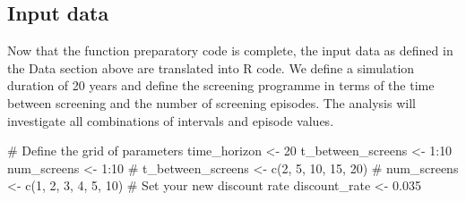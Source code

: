 \documentclass[
]{article}
\newenvironment{Shaded}{\begin{snugshade}}{\end{snugshade}}
\newcommand{\CommentTok}[1]{\textcolor[rgb]{0.37,0.37,0.37}{#1}}
\newcommand{\ControlFlowTok}[1]{\textcolor[rgb]{0.00,0.23,0.31}{\textbf{#1}}}
\newcommand{\DecValTok}[1]{\textcolor[rgb]{0.68,0.00,0.00}{#1}}
\newcommand{\FloatTok}[1]{\textcolor[rgb]{0.68,0.00,0.00}{#1}}
\newcommand{\FunctionTok}[1]{\textcolor[rgb]{0.28,0.35,0.67}{#1}}
\newcommand{\NormalTok}[1]{\textcolor[rgb]{0.00,0.23,0.31}{#1}}
\newcommand{\OtherTok}[1]{\textcolor[rgb]{0.00,0.23,0.31}{#1}}
\newcommand{\SpecialCharTok}[1]{\textcolor[rgb]{0.37,0.37,0.37}{#1}}
\begin{document}
\begin{Shaded}
\end{Shaded}

\subsection{Input data}\label{input-data}

Now that the function preparatory code is complete, the input data as
defined in the Data section above are translated into R code. We define
a simulation duration of 20 years and define the screening programme in
terms of the time between screening and the number of screening
episodes. The analysis will investigate all combinations of intervals
and episode values.

\begin{Shaded}
\begin{Highlighting}[]
\CommentTok{\# Define the grid of parameters}
\NormalTok{time\_horizon }\OtherTok{\textless{}{-}} \DecValTok{20}
\NormalTok{t\_between\_screens }\OtherTok{\textless{}{-}} \DecValTok{1}\SpecialCharTok{:}\DecValTok{10}
\NormalTok{num\_screens }\OtherTok{\textless{}{-}} \DecValTok{1}\SpecialCharTok{:}\DecValTok{10}
\CommentTok{\# t\_between\_screens \textless{}{-} c(2, 5, 10, 15, 20)}
\CommentTok{\# num\_screens \textless{}{-} c(1, 2, 3, 4, 5, 10)}
\CommentTok{\# Set your new discount rate}
\NormalTok{discount\_rate }\OtherTok{\textless{}{-}} \FloatTok{0.035}
\end{Highlighting}
\end{Shaded}
\end{document}

